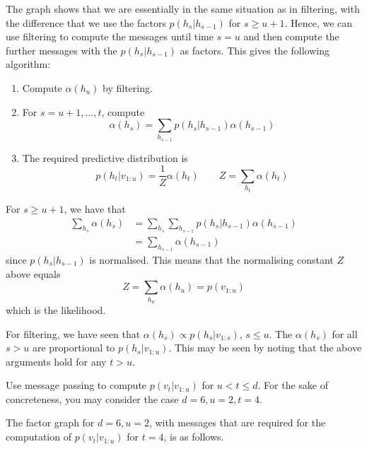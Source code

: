 \begin{exenumerate}
\begin{solution}
    The graph shows that we are essentially in the same situation as
    in filtering, with the difference that we use the factors
    $p(h_s|h_{s-1})$ for $s\ge u+1$. Hence, we can use filtering to compute
    the messages until time $s=u$ and then compute the further
    messages with the $p(h_s|h_{s-1})$ as factors. This gives the
    following algorithm:
    \begin{enumerate}
    \item Compute $\alpha(h_u)$ by filtering.
    \item For $s=u+1, \ldots, t$, compute
      \begin{equation}
        \alpha(h_s) = \sum_{h_{s-1}} p(h_s|h_{s-1}) \alpha(h_{s-1})
      \end{equation}
    \item The required predictive distribution is
      \begin{equation}
        p(h_t | v_{1:u}) = \frac{1}{Z} \alpha(h_t) \quad \quad Z = \sum_{h_t} \alpha(h_t)
      \end{equation}
    \end{enumerate}
    For $s \ge u+1$, we have that
    \begin{align}
      \sum_{h_s} \alpha(h_s) &= \sum_{h_s} \sum_{h_{s-1}} p(h_s|h_{s-1}) \alpha(h_{s-1})\\
      & =  \sum_{h_{s-1}} \alpha(h_{s-1})
    \end{align}
    since $p(h_s|h_{s-1})$ is normalised. This means that the normalising constant $Z$ above equals
    \begin{equation}
      Z = \sum_{h_u} \alpha(h_u) = p(v_{1:u})
    \end{equation}
    which is the likelihood.

    For filtering, we have seen that $\alpha(h_s) \propto
    p(h_s|v_{1:s})$, $s\le u$. The $\alpha(h_s)$ for all $s>u$ are
    proportional to $p(h_s| v_{1:u})$. This may be seen by noting that
    the above arguments hold for any $t>u$. 
  \end{solution}

\item Use message passing to compute $p(v_t|v_{1:u})$ for $u<t\le
  d$. For the sake of concreteness, you may consider the case $d=6,
  u=2, t=4$.

  \begin{solution}
    The factor graph for $d=6, u=2$, with messages that are required
    for the computation of $p(v_t|v_{1:u})$ for $t=4$, is as follows.
    \begin{center}
      \scalebox{1}{
        \begin{tikzpicture}[ugraph,minimum size=1cm, inner sep=3pt]
          

\end{tikzpicture}}
\end{center}
\end{solution}
\end{exenumerate}

